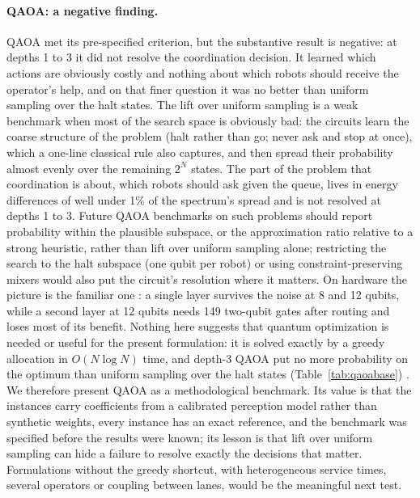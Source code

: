 \documentclass[a4paper,fleqn]{cas-dc}
\begin{document}
\paragraph{QAOA: a negative finding.} QAOA met its pre-specified criterion, but the substantive result is negative: at depths 1 to 3 it did not resolve the coordination decision. It learned which actions are obviously costly and nothing about which robots should receive the operator's help, and on that finer question it was no better than uniform sampling over the halt states. The lift over uniform sampling is a weak benchmark when most of the search space is obviously bad: the circuits learn the coarse structure of the problem (halt rather than go; never ask and stop at once), which a one-line classical rule also captures, and then spread their probability almost evenly over the remaining $2^N$ states. The part of the problem that coordination is about, which robots should ask given the queue, lives in energy differences of well under 1\% of the spectrum's spread and is not resolved at depths 1 to 3. Future QAOA benchmarks on such problems should report probability within the plausible subspace, or the approximation ratio relative to a strong heuristic, rather than lift over uniform sampling alone; restricting the search to the halt subspace (one qubit per robot) or using constraint-preserving mixers would also put the circuit's resolution where it matters. On hardware the picture is the familiar one \citep{harrigan2021qaoa}: a single layer survives the noise at 8 and 12 qubits, while a second layer at 12 qubits needs 149 two-qubit gates after routing and loses most of its benefit. Nothing here suggests that quantum optimization is needed or useful for the present formulation: it is solved exactly by a greedy allocation in $O(N\log N)$ time, and depth-3 QAOA put no more probability on the optimum than uniform sampling over the halt states (Table~\ref{tab:qaoabase}) \citep{abbas2024challenges}. We therefore present QAOA as a methodological benchmark. Its value is that the instances carry coefficients from a calibrated perception model rather than synthetic weights, every instance has an exact reference, and the benchmark was specified before the results were known; its lesson is that lift over uniform sampling can hide a failure to resolve exactly the decisions that matter. Formulations without the greedy shortcut, with heterogeneous service times, several operators or coupling between lanes, would be the meaningful next test.
\end{document}
